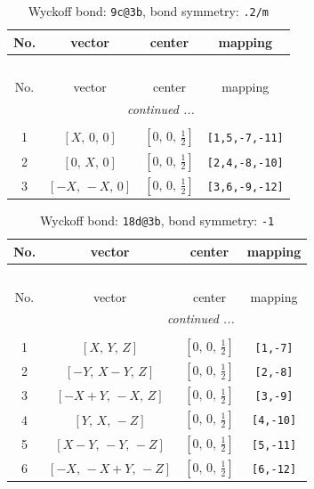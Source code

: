 \documentclass[fleqn,8pt]{jsarticle}
\begin{document}
\begin{longtable}{cccc}
\caption{Wyckoff bond: {\tt 9c@3b}, bond symmetry: {\tt .2/m}}
 \\
 \hline \hline
No. & vector & center & mapping \\ \hline \endfirsthead

\multicolumn{3}{l}{\tablename\ \thetable{}} \\
 \hline \hline
No. & vector & center & mapping \\ \hline \endhead

 \hline \hline
\multicolumn{3}{r}{\footnotesize\it continued ...} \\ \endfoot

 \hline \hline
\multicolumn{3}{r}{} \\ \endlastfoot

1 & $\left[ X,\, 0,\, 0 \right]$ & $\left[ 0,\, 0,\, \frac{1}{2} \right]$ & {\tt [1,5,-7,-11]} \\ \hline
2 & $\left[ 0,\, X,\, 0 \right]$ & $\left[ 0,\, 0,\, \frac{1}{2} \right]$ & {\tt [2,4,-8,-10]} \\ \hline
3 & $\left[ - X,\, - X,\, 0 \right]$ & $\left[ 0,\, 0,\, \frac{1}{2} \right]$ & {\tt [3,6,-9,-12]} \\
\end{longtable}
\renewcommand{\arraystretch}{1.2}
\begin{longtable}{cccc}
\caption{Wyckoff bond: {\tt 18d@3b}, bond symmetry: {\tt -1}}
 \\
 \hline \hline
No. & vector & center & mapping \\ \hline \endfirsthead

\multicolumn{3}{l}{\tablename\ \thetable{}} \\
 \hline \hline
No. & vector & center & mapping \\ \hline \endhead

 \hline \hline
\multicolumn{3}{r}{\footnotesize\it continued ...} \\ \endfoot

 \hline \hline
\multicolumn{3}{r}{} \\ \endlastfoot

1 & $\left[ X,\, Y,\, Z \right]$ & $\left[ 0,\, 0,\, \frac{1}{2} \right]$ & {\tt [1,-7]} \\ \hline
2 & $\left[ - Y,\, X - Y,\, Z \right]$ & $\left[ 0,\, 0,\, \frac{1}{2} \right]$ & {\tt [2,-8]} \\ \hline
3 & $\left[ - X + Y,\, - X,\, Z \right]$ & $\left[ 0,\, 0,\, \frac{1}{2} \right]$ & {\tt [3,-9]} \\ \hline
4 & $\left[ Y,\, X,\, - Z \right]$ & $\left[ 0,\, 0,\, \frac{1}{2} \right]$ & {\tt [4,-10]} \\ \hline
5 & $\left[ X - Y,\, - Y,\, - Z \right]$ & $\left[ 0,\, 0,\, \frac{1}{2} \right]$ & {\tt [5,-11]} \\ \hline
6 & $\left[ - X,\, - X + Y,\, - Z \right]$ & $\left[ 0,\, 0,\, \frac{1}{2} \right]$ & {\tt [6,-12]} \\
\end{longtable}
\end{document}
